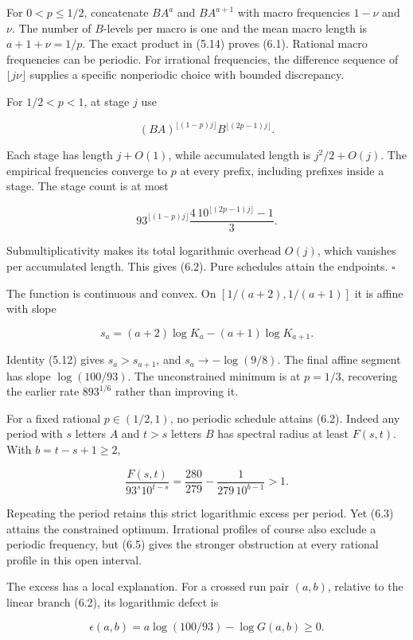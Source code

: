 For \(0<p\le1/2\), concatenate \(BA^a\) and \(BA^{a+1}\) with macro frequencies \(1-\nu\) and \(\nu\). The number of \(B\)-levels per macro is one and the mean macro length is \(a+1+\nu=1/p\). The exact product in (5.14) proves (6.1). Rational macro frequencies can be periodic. For irrational frequencies, the difference sequence of \(\lfloor j\nu\rfloor\) supplies a specific nonperiodic choice with bounded discrepancy.

For \(1/2<p<1\), at stage \(j\) use

\[
(BA)^{\lfloor(1-p)j\rfloor}
B^{\lfloor(2p-1)j\rfloor}.
\tag{6.3}
\]

Each stage has length \(j+O(1)\), while accumulated length is \(j^2/2+O(j)\). The empirical frequencies converge to \(p\) at every prefix, including prefixes inside a stage. The stage count is at most

\[
93^{\lfloor(1-p)j\rfloor}
\frac{4\,10^{\lfloor(2p-1)j\rfloor}-1}{3}.
\]

Submultiplicativity makes its total logarithmic overhead \(O(j)\), which vanishes per accumulated length. This gives (6.2). Pure schedules attain the endpoints. \(\square\)

The function is continuous and convex. On \([1/(a+2),1/(a+1)]\) it is affine with slope

\[
s_a=(a+2)\log K_a-(a+1)\log K_{a+1}.
\tag{6.4}
\]

Identity (5.12) gives \(s_a>s_{a+1}\), and \(s_a\to-\log(9/8)\). The final affine segment has slope \(\log(100/93)\). The unconstrained minimum is at \(p=1/3\), recovering the earlier rate \(893^{1/6}\) rather than improving it.

For a fixed rational \(p\in(1/2,1)\), no periodic schedule attains (6.2). Indeed any period with \(s\) letters \(A\) and \(t>s\) letters \(B\) has spectral radius at least \(F(s,t)\). With \(b=t-s+1\ge2\),

\[
\boxed{
\frac{F(s,t)}{93^s10^{t-s}}
=\frac{280}{279}-\frac{1}{279\,10^{b-1}}>1.
}
\tag{6.5}
\]

Repeating the period retains this strict logarithmic excess per period. Yet (6.3) attains the constrained optimum. Irrational profiles of course also exclude a periodic frequency, but (6.5) gives the stronger obstruction at every rational profile in this open interval.

The excess has a local explanation. For a crossed run pair \((a,b)\), relative to the linear branch (6.2), its logarithmic defect is

\[
\epsilon(a,b)=a\log(100/93)-\log G(a,b)\ge0.
\tag{6.6}
\]

